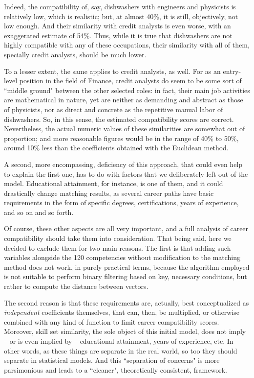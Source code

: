\documentclass{article}
\begin{document}
Indeed, the compatibility of, say, dishwashers with engineers and physicists is
relatively low, which is realistic; but, at almost 40\%, it is still,
objectively, not low enough. And their similarity with credit analysts is even
worse, with an exaggerated estimate of 54\%. Thus, while it is true that
dishwashers are not highly compatible with any of these occupations, their
similarity with all of them, specially credit analysts, should be much lower.

To a lesser extent, the same applies to credit analysts, as well. For as an
entry-level position in the field of Finance, credit analysts do seem to be
some sort of ``middle ground" between the other selected roles: in fact, their
main job activities are mathematical in nature, yet are neither as demanding
and abstract as those of physicists, nor as direct and concrete as the
repetitive manual labor of dishwashers. So, in this sense, the estimated
compatibility scores are correct. Nevertheless, the actual numeric values of
these similarities are somewhat out of proportion; and more reasonable figures
would be in the range of 40\% to 50\%, around 10\% less than the coefficients
obtained with the Euclidean method.

A second, more encompassing, deficiency of this approach, that could even help
to explain the first one, has to do with factors that we deliberately left out
of the model. Educational attainment, for instance, is one of them, and it
could drastically change matching results, as several career paths have basic
requirements in the form of specific degrees, certifications, years of
experience, and so on and so forth.

Of course, these other aspects are all very important, and a full analysis of
career compatibility should take them into consideration. That being said, here
we decided to exclude them for two main reasons. The first is that adding such
variables alongside the 120 competencies without modification to the matching
method does not work, in purely practical terms, because the algorithm employed
is not suitable to perform binary filtering based on key, necessary conditions,
but rather to compute the distance between vectors.

The second reason is that these requirements are, actually, best conceptualized
as \textit{independent} coefficients themselves, that can, then, be multiplied,
or otherwise combined with any kind of function to limit career compatibility
scores. Moreover, skill set similarity, the sole object of this initial model,
does not imply -- or is even implied by -- educational attainment, years of
experience, etc. In other words, as these things are separate in the real
world, so too they should separate in statistical models. And this ``separation
of concerns" is more parsimonious and leads to a ``cleaner", theoretically
consistent, framework.
\end{document}
